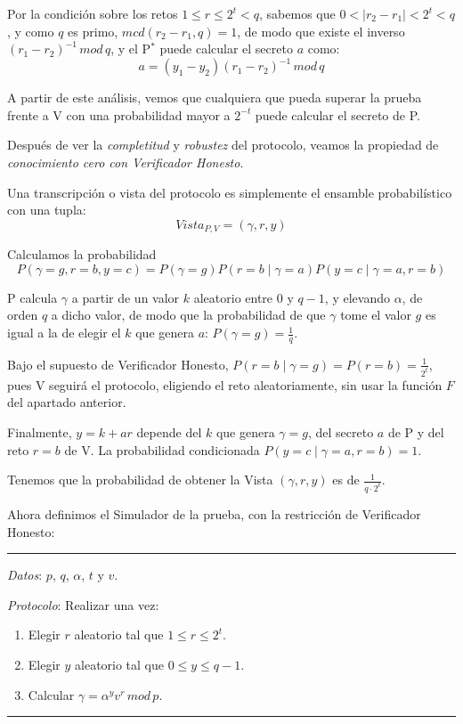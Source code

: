 Por la condición sobre los retos $1\leq r \leq 2^t < q$, sabemos que $0 < \mid r_2 - r_1 \mid < 2^t < q$, y como $q$ es primo, $mcd(r_2-r_1,q)=1$, de modo que existe el inverso $(r_1 - r_2)^{-1} \, mod \, q$, y el P$^*$ puede calcular el secreto $a$ como:
\[
	a = (y_1-y_2)(r_1-r_2)^{-1}\, mod \, q
\]

A partir de este análisis, vemos que cualquiera que pueda superar la prueba frente a V con una probabilidad mayor a $2^{-t}$ puede calcular el secreto de P.




\hfil



Después de ver la \textit{completitud} y \textit{robustez} del protocolo, veamos la propiedad de \textit{conocimiento cero con Verificador Honesto}.

Una transcripción o vista del protocolo es simplemente el ensamble probabilístico con una tupla:
\[
Vista_{P,V} =(\gamma, r, y)
\]

Calculamos la probabilidad 
\[
	P(\gamma=g, r=b, y=c) = P(\gamma=g)P(r=b\mid \gamma =a)P(y=c\mid \gamma=a, r=b)
\]


P calcula $\gamma$ a partir de un valor $k$ aleatorio entre $0$ y $q-1$, y elevando $\alpha$, de orden $q$ a dicho valor, de modo que la probabilidad de que $\gamma$ tome el valor $g$ es igual a la de elegir el $k$ que genera $a$: $P(\gamma=g)=\frac{1}{q}$.

Bajo el supuesto de Verificador Honesto, $P(r=b\mid \gamma =g)=P(r=b)=\frac{1}{2^t}$, pues V seguirá el protocolo, eligiendo el reto aleatoriamente, sin usar la función $F$ del apartado anterior.

Finalmente, $y=k+ar$ depende del $k$ que genera $\gamma=g$, del secreto $a$ de P y del reto $r=b$ de V. La probabilidad condicionada $P(y=c\mid \gamma=a, r=b)=1$.

Tenemos que la probabilidad de obtener la Vista $(\gamma, r, y)$ es de $\frac{1}{q\cdot 2^{t}}$.

\hfil

Ahora definimos el Simulador de la prueba, con la restricción de Verificador Honesto:


\rule{\textwidth}{1pt}
\begin{algorithm}
	
	\hfil
	
	\textit{Datos}: $p$, $q$, $\alpha$, $t$ y $v$.
	
	\textit{Protocolo}: Realizar una vez:
	
	\begin{enumerate}
		
		\item Elegir $r$ aleatorio tal que $1\leq r \leq 2^t$.
		\item Elegir $y$ aleatorio tal que $0\leq y \leq q-1$.
		\item Calcular $\gamma = \alpha ^y v^r \, mod \, p$.		
		
	\end{enumerate}
	
\end{algorithm}
\rule{\textwidth}{1pt}


